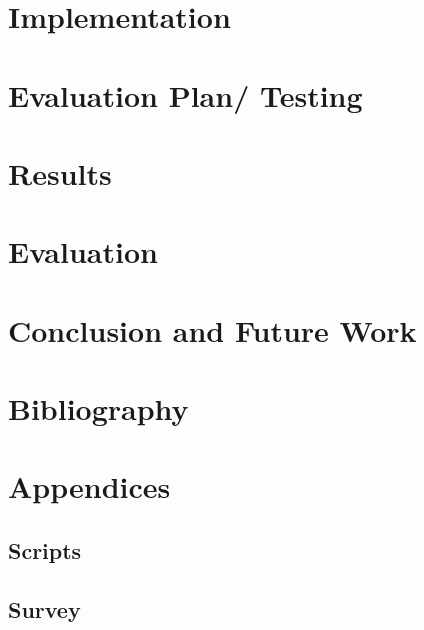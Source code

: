 \documentclass[12pt,a4paper]{report}
\begin{document}
\chapter{Implementation}\label{chp:imp}


\chapter{Evaluation Plan/ Testing}\label{chp:tes}


\chapter{Results}\label{chp:res}


\chapter{Evaluation}\label{chp:eva}


\chapter{Conclusion and Future Work}\label{chp:con}


\chapter{Bibliography}\label{chp:bib}
\begingroup
	\def\chapter*#1{}


\endgroup

\chapter{Appendices}\label{chp:app}
\renewcommand{\thesection}{\Alph{section}}
\section{Scripts}
\section{Survey}
\end{document}
